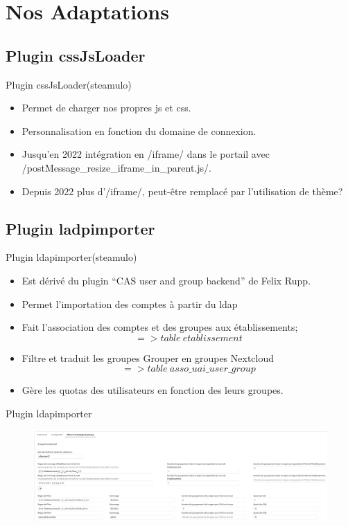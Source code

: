 \section{Nos Adaptations}
\subsection{Plugin cssJsLoader}
\begin{frame}[fragile]{Plugin cssJsLoader}{(steamulo)}
\begin{itemize}
\item Permet de charger nos propres js et css.
\item Personnalisation en fonction du domaine de connexion.
\item Jusqu'en 2022 intégration en \code/iframe/ dans le portail avec \code/postMessage_resize_iframe_in_parent.js/.
\item Depuis 2022 plus d'\code/iframe/, peut-être remplacé par l'utilisation de thème? 
\end{itemize}
\end{frame} 

\subsection{Plugin ladpimporter}
\begin{frame}{Plugin ldapimporter}{(steamulo)} %
\begin{itemize}
\item Est dérivé du plugin ``CAS user and group backend'' de Felix Rupp.
\item Permet l'importation des comptes à partir du ldap
\item Fait l'association des comptes et des groupes aux établissements;
		{\small $$ => table\ etablissement $$} 
\item Filtre et traduit les groupes Grouper en groupes Nextcloud
		{\small $$ => table\ asso\_uai\_user\_group $$ } 
\item Gère les quotas des utilisateurs en fonction des leurs groupes.
\end{itemize}
\end{frame}


\begin{frame}{Plugin ldapimporter} %
\begin{figure}
\includegraphics[width=\textwidth, height=0.85\textheight]{ldapimporter.png}
\end{figure}
\end{frame}

